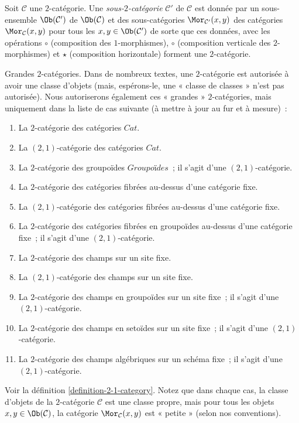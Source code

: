 \begin{definition}
\label{definition-sub-2-category}
Soit $\mathcal{C}$ une $2$-catégorie. Une {\it sous-$2$-catégorie}
$\mathcal{C}'$ de $\mathcal{C}$ est donnée par un sous-ensemble
$\Ob(\mathcal{C}')$ de $\Ob(\mathcal{C})$ et des sous-catégories
$\Mor_{\mathcal{C}'}(x, y)$ des catégories $\Mor_\mathcal{C}(x, y)$ pour tous
les $x, y \in \Ob(\mathcal{C}')$ de sorte que ces données, avec les opérations
$\circ$ (composition des $1$-morphismes), $\circ$ (composition verticale des
$2$-morphismes) et $\star$ (composition horizontale) forment une
$2$-catégorie.
\end{definition}

\begin{remark}
\label{remark-big-2-categories}
Grandes $2$-catégories. Dans de nombreux textes, une $2$-catégorie est
autorisée à avoir une classe d'objets (mais, espérons-le, une « classe de
classes » n'est pas autorisée). Nous autoriserons également ces « grandes »
$2$-catégories, mais uniquement dans la liste de cas suivante (à mettre à jour
au fur et à mesure) :
\begin{enumerate}
\item La $2$-catégorie des catégories $\textit{Cat}$.
\item La $(2, 1)$-catégorie des catégories $\textit{Cat}$.
\item La $2$-catégorie des groupoïdes $\textit{Groupoïdes}$ ; il s'agit d'une
$(2, 1)$-catégorie.
\item La $2$-catégorie des catégories fibrées au-dessus d'une catégorie fixe.
\item La $(2, 1)$-catégorie des catégories fibrées au-dessus d'une catégorie fixe.
\item La $2$-catégorie des catégories fibrées en groupoïdes au-dessus d'une catégorie
fixe ; il s'agit d'une $(2, 1)$-catégorie.
\item La $2$-catégorie des champs sur un site fixe.
\item La $(2, 1)$-catégorie des champs sur un site fixe.
\item La $2$-catégorie des champs en groupoïdes sur un site fixe ; il s'agit
d'une $(2, 1)$-catégorie.
\item La $2$-catégorie des champs en setoïdes sur un site fixe ; il s'agit d'une
$(2, 1)$-catégorie.
\item La $2$-catégorie des champs algébriques sur un schéma fixe ; il s'agit
d'une $(2, 1)$-catégorie.
\end{enumerate}
Voir la définition \ref{definition-2-1-category}. Notez que dans chaque cas,
la classe d'objets de la $2$-catégorie $\mathcal{C}$ est une classe propre,
mais pour tous les objets $x, y \in \Ob(\mathcal{C})$, la catégorie $\Mor_\mathcal{C}(x, y)$ est « petite » (selon nos conventions).
\end{remark}


